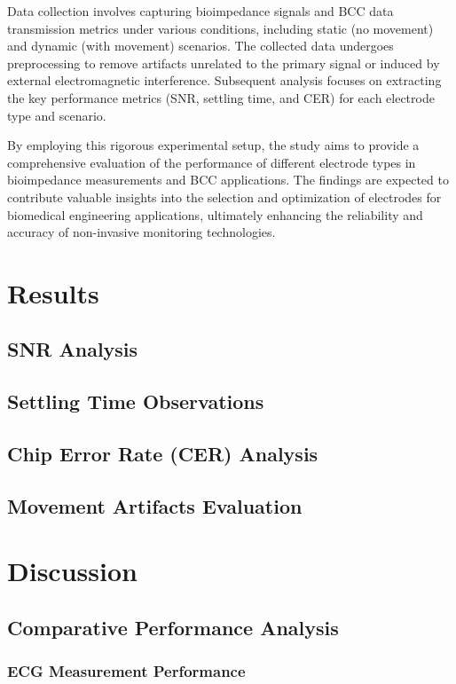 \documentclass[conference]{IEEEtran}
\begin{document}
Data collection involves capturing bioimpedance signals and BCC data transmission metrics under various conditions, including static (no movement) and dynamic (with movement) scenarios. The collected data undergoes preprocessing to remove artifacts unrelated to the primary signal or induced by external electromagnetic interference. Subsequent analysis focuses on extracting the key performance metrics (SNR, settling time, and CER) for each electrode type and scenario.

By employing this rigorous experimental setup, the study aims to provide a comprehensive evaluation of the performance of different electrode types in bioimpedance measurements and BCC applications. The findings are expected to contribute valuable insights into the selection and optimization of electrodes for biomedical engineering applications, ultimately enhancing the reliability and accuracy of non-invasive monitoring technologies.



\section{Results}
\subsection{SNR Analysis}
\subsection{Settling Time Observations}
\subsection{Chip Error Rate (CER) Analysis}
\subsection{Movement Artifacts Evaluation}

\section{Discussion}
\subsection{Comparative Performance Analysis}
\subsubsection{ECG Measurement Performance}
\end{document}
